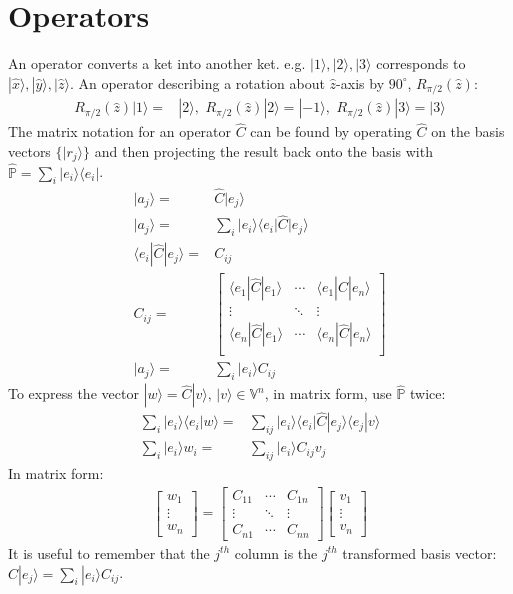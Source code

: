 \documentclass[12pt]{article}
\begin{document}
\section{Operators}
An operator converts a ket into another ket. e.g. $|1\rangle, |2\rangle,|3\rangle$ corresponds to $|\hat{x}\rangle, |\hat{y}\rangle,|\hat{z}\rangle$. An operator describing a rotation about $\hat{z}$-axis by $90^\circ$, $R_{\pi/2}(\hat{z})$:
\begin{align*}
R_{\pi/2}(\hat{z})|1\rangle =& |2\rangle,\,\,R_{\pi/2}(\hat{z})|2\rangle  = |-1\rangle,\,\,R_{\pi/2}(\hat{z})|3\rangle  = |3\rangle
\end{align*}
The matrix notation for an operator $\hat{C}$ can be found by operating $\hat{C}$ on  the basis vectors $\lbrace|r_j\rangle\rbrace$ and then projecting the result back onto the basis with $\mathbb{\hat{P}}= \sum_i |e_i\rangle\langle e_i|$.
\begin{align*}
|a_j\rangle =& \hat{C}|e_j\rangle
\\
|a_j\rangle =& \sum_i |e_i\rangle\langle e_i|\hat{C}|e_j\rangle
\\
\langle e_i|\hat{C}|e_j\rangle =& C_{ij}
\\
C_{ij} =&
\begin{bmatrix}
\langle e_1|\hat{C}|e_1\rangle & \cdots & \langle e_1|\hat{C}|e_n\rangle\\
\vdots & \ddots & \vdots\\
\langle e_n|\hat{C}|e_1\rangle & \cdots & \langle e_n|\hat{C}|e_n\rangle\\
\end{bmatrix}
\\
|a_j\rangle =& \sum_i |e_i\rangle C_{ij}
\end{align*}
To express the vector $ |w\rangle = \hat{C} |v\rangle, \, |v\rangle \in \mathbb{V}^n$, in matrix form, use $\mathbb{\hat{P}}$ twice:
\begin{align*}
\sum_i|e_i\rangle\langle e_i|w\rangle =& \sum_{ij} |e_i\rangle\langle e_i|\hat{C}|e_j\rangle \langle e_j|v\rangle
\\
\sum_i|e_i\rangle w_i =& \sum_{ij} |e_i\rangle C_{ij}v_j
\end{align*}
In matrix form:
\begin{align*}
\begin{bmatrix}
w_1 \\  \vdots \\ w_n
\end{bmatrix}
=
\begin{bmatrix}
C_{11} & \cdots & C_{1n} \\
\vdots & \ddots & \vdots \\
C_{n1} & \cdots & C_{nn} 
\end{bmatrix}
\begin{bmatrix}
v_1 \\  \vdots \\ v_n
\end{bmatrix}
\end{align*}
It is useful to remember that the $j^{th}$ column is the $j^{th}$ transformed basis vector: $\hat{C}|e_j\rangle = \sum_i |e_i\rangle C_{ij}$.
\end{document}
